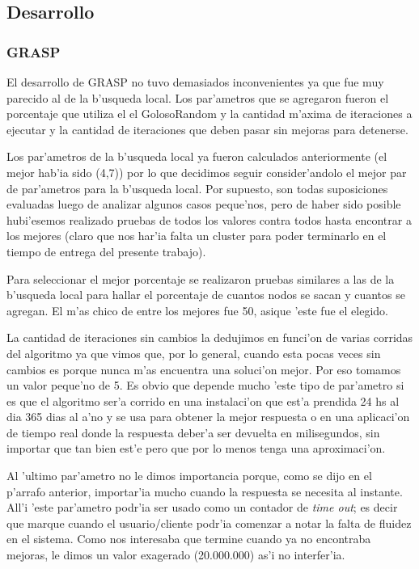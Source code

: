 \subsection{Desarrollo}
\subsubsection{GRASP}
El desarrollo de GRASP no tuvo demasiados inconvenientes ya que fue muy parecido al de la b'usqueda local. Los par'ametros que se agregaron fueron el porcentaje que utiliza el el GolosoRandom y la cantidad m'axima de iteraciones a ejecutar y la cantidad de iteraciones que deben pasar sin mejoras para detenerse. 

Los par'ametros de la b'usqueda local ya fueron calculados anteriormente (el mejor hab'ia sido (4,7)) por lo que decidimos seguir consider'andolo el mejor par de par'ametros para la b'usqueda local. Por supuesto, son todas suposiciones evaluadas luego de analizar algunos casos peque'nos, pero de haber sido posible hubi'esemos realizado pruebas de todos los valores contra todos hasta encontrar a los mejores (claro que nos har'ia falta un cluster para poder terminarlo en el tiempo de entrega del presente trabajo). 

Para seleccionar el mejor porcentaje se realizaron pruebas similares a las de la b'usqueda local para hallar el porcentaje de cuantos nodos se sacan y cuantos se agregan. El m'as chico de entre los mejores fue 50, asique 'este fue el elegido.

La cantidad de iteraciones sin cambios la dedujimos en funci'on de varias corridas del algoritmo ya que vimos que, por lo general, cuando esta pocas veces sin cambios es porque nunca m'as encuentra una soluci'on mejor. Por eso tomamos un valor peque'no de 5. Es obvio que depende mucho 'este tipo de par'ametro si es que el algoritmo ser'a corrido en una instalaci'on que est'a prendida 24 hs al dia 365 dias al a'no y se usa para obtener la mejor respuesta o en una aplicaci'on de tiempo real donde la respuesta deber'a ser devuelta en milisegundos, sin importar que tan bien est'e pero que por lo menos tenga una aproximaci'on.

Al 'ultimo par'ametro no le dimos importancia porque, como se dijo en el p'arrafo anterior, importar'ia mucho cuando la respuesta se necesita al instante. All'i 'este par'ametro podr'ia ser usado como un contador de \emph{time out}; es decir que marque cuando el usuario/cliente podr'ia comenzar a notar la falta de fluidez en el sistema. Como nos interesaba que termine cuando ya no encontraba mejoras, le dimos un valor exagerado (20.000.000) as'i no interfer'ia.

